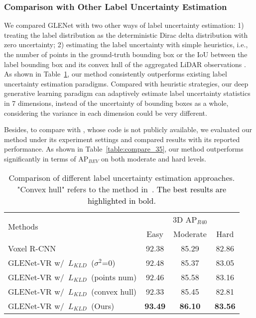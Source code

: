 \documentclass[twocolumn]{svjour3}
\newcommand{\revise}[1]{\textcolor{black}{#1}}
\begin{document}
\subsubsection{Comparison with Other Label Uncertainty Estimation} We compared GLENet with two other ways of label uncertainty estimation: 1) treating the label distribution as the deterministic Dirac delta distribution with zero uncertainty; 2) estimating the label uncertainty with simple heuristics, i.e., the number of points in the ground-truth bounding box or the IoU between the label bounding box and its convex hull of the aggregated LiDAR observations \citep{meyer2020learning}.
As shown in Table~\ref{table:label_generating}, our method consistently outperforms existing label uncertainty estimation paradigms. Compared with heuristic strategies, our deep generative learning paradigm can adaptively estimate label uncertainty statistics in 7 dimensions, instead of the uncertainty of bounding boxes as a whole, considering the variance in each dimension could be very different.


Besides, to compare with \citep{feng_iros}, whose code is not publicly available, we evaluated our method under its experiment settings and compared results with its reported performance.
As shown in Table~\ref{table:compare_35}, our method outperforms \citep{feng_iros} significantly in terms of $\mathrm{AP}_{BEV}$ on both moderate and hard levels.

\setlength{\tabcolsep}{5pt}
\begin{table}[t]
\centering
\caption{Comparison of different label uncertainty estimation approaches. "Convex hull" refers to the method in~\citep{meyer2020learning}. \revise{The best results are highlighted in bold.}}
\label{table:label_generating}
\begin{tabular}{l|ccc} 
\toprule
\multirow{2}{*}{Methods}                    & \multicolumn{3}{c}{3D $\mathrm{AP}_{R40}$}  \\
                                           & Easy  & Moderate  & Hard                        \\ 
\hline
Voxel R-CNN                                   & 92.38 & 85.29    & 82.86                    \\
GLENet-VR w/~$L_{KLD}$~($\sigma^2$=0)           & 92.48 & 85.37    & 83.05                    \\
GLENet-VR w/~$L_{KLD}$~(points num)             & 92.46 & 85.58    & 83.16                    \\
GLENet-VR w/~$L_{KLD}$~(convex hull)   & 92.33 & 85.45    & 82.81                    \\
GLENet-VR w/~$L_{KLD}$~(Ours)                   & \textbf{93.49} & \textbf{86.10}    & \textbf{83.56}                    \\
\bottomrule
\end{tabular}
\end{table}
\setlength{\tabcolsep}{1.5pt}
\end{document}
